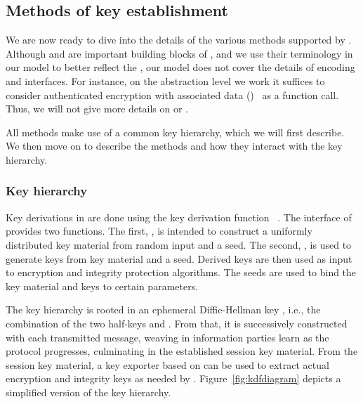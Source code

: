 \subsection{Methods of key establishment}
\label{sec:methods}
We are now ready to dive into the details of the various methods supported by
\mEdhoc.
%
Although \mCose{} and \mCbor{} are important building blocks of \mEdhoc{}, and
we use their terminology in our \mTamarin{} model to better reflect the
\mSpec{}, our model does not cover
the details of encoding and \mCose{} interfaces.
%
For instance, on the abstraction level we work it suffices to consider
authenticated encryption with associated data (\mAead{})~\cite{aead} as a
function call.
%
Thus, we will not give more details on \mCose{} or \mCbor{}.
%

All methods make use of a common key hierarchy, which we will first describe.
%
We then move on to describe the methods and how they interact with the
key hierarchy.
%

\subsubsection{Key hierarchy}
\label{sec:keyHierarchy}
Key derivations in \mEdhoc{} are done using the key derivation function
\mHkdf{}~\cite{rfc5869}.
%
The interface of \mHkdf{} provides two functions.
%
The first, \mHkdfExtract{}, is intended to construct a uniformly distributed
key material from random input and a seed.
%
The second, \mHkdfExpand{}, is used to generate keys from key material and a
seed.
%
Derived keys are then used as input to encryption and integrity protection
algorithms.
%
The seeds are used to bind the key material and keys to certain parameters.
%

The key hierarchy is rooted in an ephemeral Diffie-Hellman key \mGxy{}, i.e.,
the combination of the two half-keys \mGx{} and \mGy{}.
%
From that, it is successively constructed with each transmitted message, weaving
in information parties learn as the protocol progresses, culminating in the
established session key material.
%
From the session key material, a key exporter based on \mHkdf{} can be used to
extract actual encryption and integrity keys as needed by \mOscore{}.
%
Figure~\ref{fig:kdfdiagram} depicts a simplified version of the key hierarchy.
%

